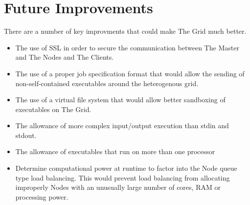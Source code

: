 \chapter{Future Improvements}
\label{futureimprovements}

There are a number of key improvments that could make The Grid much better.

\begin{itemize}
\item The use of SSL in order to secure the communication between The Master and The Nodes and The Clients.

\item The use of a proper job specification format that would allow the sending of non-self-contained executables around the heterogenous grid.

\item The use of a virtual file system that would allow better sandboxing of executables on The Grid.

\item The allowance of more complex input\slash output execution than stdin and stdout.

\item The allowance of executables that run on more than one processor

\item Determine computational power at runtime to factor into the Node queue type load balancing. This would prevent load balancing from allocating improperly Nodes with an unusually large number of cores, RAM or processing power.

\end{itemize}
